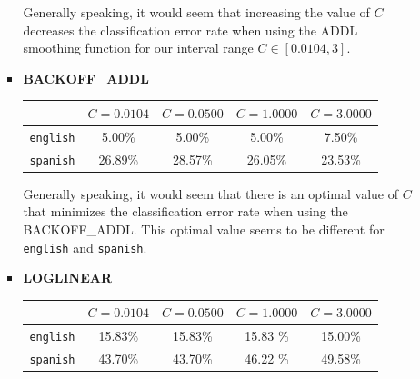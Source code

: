 \documentclass[11pt]{article}
\begin{document}
\begin{enumerate}
\begin{enumerate}[label=(\alph*)]
\begin{itemize}
			Generally speaking, it would seem that increasing the value of $C$ decreases the classification error rate when using the ADDL smoothing function for our interval range $C \in [0.0104, 3]$.
			\vspace{8pt} \\

		\item[] \hspace{-24pt} \textbf{BACKOFF\_ADDL} \vspace{8pt}

			\begin{center}\begin{tabular}{| r || c | c | c | c |}
			\hline
							 & $C=0.0104$ & $C=0.0500$ & $C=1.0000$ & $C=3.0000$ \\
			\hline \hline
			\texttt{english} & 5.00\%     & 5.00\%	   & 5.00\%     & 7.50\%	 \\
			\texttt{spanish} & 26.89\%    & 28.57\%	   & 26.05\%    & 23.53\%	 \\
			\hline
			\end{tabular}\end{center}

			Generally speaking, it would seem that there is an optimal value of $C$ that minimizes the classification error rate when using the BACKOFF\_ADDL. This optimal value seems to be different for \texttt{english} and \texttt{spanish}.
			\vspace{8pt} \\

		\newpage
		\item[] \hspace{-24pt} \textbf{LOGLINEAR} \vspace{8pt}

			\begin{center}\begin{tabular}{| r || c | c | c | c |}
			\hline
							 & $C=0.0104$ & $C=0.0500$ & $C=1.0000$ & $C=3.0000$ \\
			\hline \hline
			\texttt{english} & 15.83\%    & 15.83\%	   & 15.83 \%   & 15.00\%	 \\
			\texttt{spanish} & 43.70\%    & 43.70\%	   & 46.22 \%   & 49.58\%	 \\
			\hline
			\end{tabular}\end{center}

		\end{itemize}



\end{enumerate}
\end{enumerate}
\end{document}
